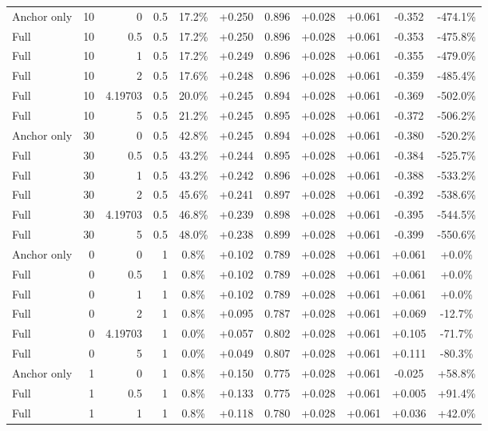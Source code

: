 \begin{table}[htbp]
\begin{tabular}{lrrrccccccc}
Anchor only & 10 & 0 & 0.5 & 17.2\% & +0.250 & 0.896 & +0.028 & +0.061 & -0.352 & -474.1\% \\
Full & 10 & 0.5 & 0.5 & 17.2\% & +0.250 & 0.896 & +0.028 & +0.061 & -0.353 & -475.8\% \\
Full & 10 & 1 & 0.5 & 17.2\% & +0.249 & 0.896 & +0.028 & +0.061 & -0.355 & -479.0\% \\
Full & 10 & 2 & 0.5 & 17.6\% & +0.248 & 0.896 & +0.028 & +0.061 & -0.359 & -485.4\% \\
Full & 10 & 4.19703 & 0.5 & 20.0\% & +0.245 & 0.894 & +0.028 & +0.061 & -0.369 & -502.0\% \\
Full & 10 & 5 & 0.5 & 21.2\% & +0.245 & 0.895 & +0.028 & +0.061 & -0.372 & -506.2\% \\
Anchor only & 30 & 0 & 0.5 & 42.8\% & +0.245 & 0.894 & +0.028 & +0.061 & -0.380 & -520.2\% \\
Full & 30 & 0.5 & 0.5 & 43.2\% & +0.244 & 0.895 & +0.028 & +0.061 & -0.384 & -525.7\% \\
Full & 30 & 1 & 0.5 & 43.2\% & +0.242 & 0.896 & +0.028 & +0.061 & -0.388 & -533.2\% \\
Full & 30 & 2 & 0.5 & 45.6\% & +0.241 & 0.897 & +0.028 & +0.061 & -0.392 & -538.6\% \\
Full & 30 & 4.19703 & 0.5 & 46.8\% & +0.239 & 0.898 & +0.028 & +0.061 & -0.395 & -544.5\% \\
Full & 30 & 5 & 0.5 & 48.0\% & +0.238 & 0.899 & +0.028 & +0.061 & -0.399 & -550.6\% \\
Anchor only & 0 & 0 & 1 & 0.8\% & +0.102 & 0.789 & +0.028 & +0.061 & +0.061 & +0.0\% \\
Full & 0 & 0.5 & 1 & 0.8\% & +0.102 & 0.789 & +0.028 & +0.061 & +0.061 & +0.0\% \\
Full & 0 & 1 & 1 & 0.8\% & +0.102 & 0.789 & +0.028 & +0.061 & +0.061 & +0.0\% \\
Full & 0 & 2 & 1 & 0.8\% & +0.095 & 0.787 & +0.028 & +0.061 & +0.069 & -12.7\% \\
Full & 0 & 4.19703 & 1 & 0.0\% & +0.057 & 0.802 & +0.028 & +0.061 & +0.105 & -71.7\% \\
Full & 0 & 5 & 1 & 0.0\% & +0.049 & 0.807 & +0.028 & +0.061 & +0.111 & -80.3\% \\
Anchor only & 1 & 0 & 1 & 0.8\% & +0.150 & 0.775 & +0.028 & +0.061 & -0.025 & +58.8\% \\
Full & 1 & 0.5 & 1 & 0.8\% & +0.133 & 0.775 & +0.028 & +0.061 & +0.005 & +91.4\% \\
Full & 1 & 1 & 1 & 0.8\% & +0.118 & 0.780 & +0.028 & +0.061 & +0.036 & +42.0\% \\

\end{tabular}
\end{table}
